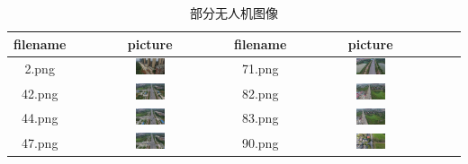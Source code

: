 \begin{table}[htbp]
    \centering
    \caption{部分无人机图像}
      \begin{tabular}{ccccc}
        \toprule
        filename & picture  & filename  & picture \\
        \midrule
        2.png & \includegraphics[width=0.2\textwidth]{pic/raw/2.png} & 71.png & \includegraphics[width=0.2\textwidth]{pic/raw/71.png} \\
        42.png & \includegraphics[width=0.2\textwidth]{pic/raw/42.png} & 82.png & \includegraphics[width=0.2\textwidth]{pic/raw/82.png} \\
        44.png & \includegraphics[width=0.2\textwidth]{pic/raw/44.png} & 83.png & \includegraphics[width=0.2\textwidth]{pic/raw/83.png} \\
        47.png & \includegraphics[width=0.2\textwidth]{pic/raw/47.png} & 90.png & \includegraphics[width=0.2\textwidth]{pic/raw/90.png} \\

\end{tabular}
\end{table}
